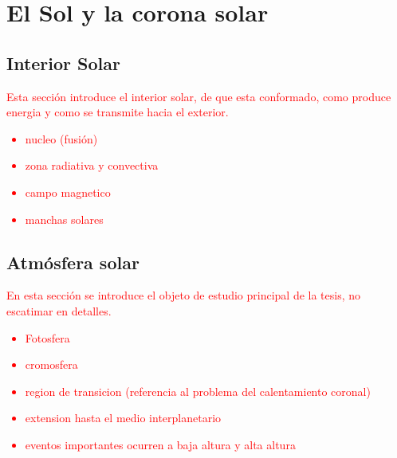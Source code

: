 
\chapter{El Sol y la corona solar}

\section{Interior Solar}
\textcolor{red}{
Esta sección introduce el interior solar, de que esta conformado, como produce energia y como se transmite hacia el exterior.
\begin{itemize}
  \item nucleo (fusión)
  \item zona radiativa y convectiva
  \item campo magnetico
  \item manchas solares
\end{itemize}
}
\section{Atmósfera solar}
\textcolor{red}{En esta sección se introduce el objeto de estudio principal de la tesis, no escatimar en detalles. 
\begin{itemize}
  \item Fotosfera
  \item cromosfera
  \item region de transicion (referencia al problema del calentamiento coronal)
  \item extension hasta el medio interplanetario
  \item eventos importantes ocurren a baja altura y alta altura
\end{itemize}
}

